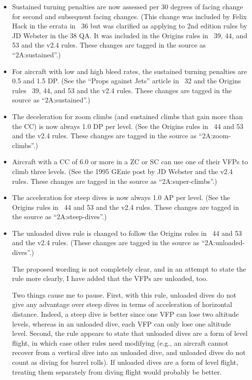 \documentclass[10pt]{article}
\begin{document}
\begin{itemize}
    \item Sustained turning penalties are now assessed per 30 degrees of facing change for second and subsequent facing changes. (This change was included by Felix Hack in the errata in {\APJ}~36 but was clarified as applying to 2nd edition rules by JD Webster in the {\APJ} 38 QA. It was included in the Origins rules in {\APJ}~39, 44, and 53 and the v2.4 rules. These changes are tagged in the source as “2A:sustained”.)

    \item For aircraft with low and high bleed rates, the sustained turning penalties are 0.5 and 1.5 DP. (See the “Props against Jets” article in {\APJ}~32 and the Origins rules {\APJ}~39, 44, and 53 and the v2.4 rules. These changes are tagged in the source as “2A:sustained”.) 

    \item The deceleration for zoom climbs (and sustained climbs that gain more than the CC) is now always 1.0 DP per level. (See the Origins rules {in \APJ}~44 and 53 and the v2.4 rules. These changes are tagged in the source as “2A:zoom-climbs”.) 

    \item Aircraft with a CC of 6.0 or more in a ZC or SC can use one of their VFPs to climb three levels. (See the 1995 GEnie post by JD Webster and the v2.4 rules. These changes are tagged in the source as “2A:super-climbs”.)

    \item The acceleration for steep dives is now always 1.0 AP per level. (See the Origins rules in {\APJ}~44 and 53 and the v2.4 rules. These changes are tagged in the source as “2A:steep-dives”.)

    \item The unloaded dives rule is changed to follow the Origins rules in {\APJ}~44 and 53 and the v2.4 rules. (These changes are tagged in the source as “2A:unloaded-dives”.) 
    
    The proposed wording is not completely clear, and in an attempt to state the rule more clearly, I have added that the VFPs are unloaded, too. 
    
    Two things cause me to pause. First, with this rule, unloaded dives do not give any advantage over steep dives in terms of acceleration of horizontal distance. Indeed, a steep dive is better since one VFP can lose two altitude levels, whereas in an unloaded dive, each VFP can only lose one altitude level. Second, the rule appears to state that unloaded dives are a form of level flight, in which case other rules need modifying (e.g., an aircraft cannot recover from a vertical dive into an unloaded dive, and unloaded dives do not count as diving for barrel rolls). If unloaded dives are a form of level flight, treating them separately from diving flight would probably be better.


\end{itemize}
\end{document}
